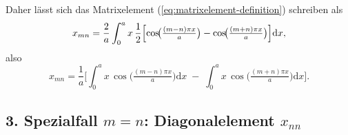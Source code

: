 \documentclass{scrartcl}
\begin{document}
\medskip

Daher lässt sich das Matrixelement (\ref{eq:matrixelement-definition}) schreiben als
\[
x_{mn} 
= \frac{2}{a} \int_{0}^{a} x \,\frac{1}{2}\Bigl[\cos\!\bigl(\tfrac{(m-n)\pi x}{a}\bigr) - \cos\!\bigl(\tfrac{(m+n)\pi x}{a}\bigr)\Bigr]\mathrm{d}x,
\]
also
\begin{equation}
x_{mn} 
= \frac{1}{a}\Biggl[
\int_{0}^{a} x\,\cos\!\bigl(\tfrac{(m-n)\pi x}{a}\bigr)\mathrm{d}x
\;-\;
\int_{0}^{a} x\,\cos\!\bigl(\tfrac{(m+n)\pi x}{a}\bigr)\mathrm{d}x
\Biggr].
\label{eq:xmn-zwei-integrale}
\end{equation}

\subsection*{3. Spezialfall \(m=n\): Diagonalelement \(x_{nn}\)}
\end{document}
